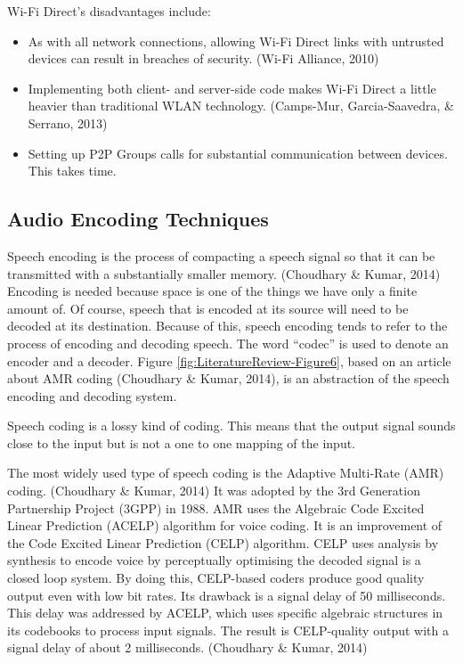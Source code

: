 \documentclass[12pt,svgnames,smaller]{article} %
\begin{document}
\begin{enumerate}
		Wi-Fi Direct’s disadvantages include:
		
		\begin{itemize}
			\item As with all network connections, allowing Wi-Fi Direct links with untrusted devices can result in breaches of security. (Wi-Fi Alliance, 2010)
			\item Implementing both client- and server-side code makes Wi-Fi Direct a little heavier than traditional WLAN technology. (Camps-Mur, Garcia-Saavedra, \& Serrano, 2013)
			\item Setting up P2P Groups calls for substantial communication between devices. This takes time. 
		\end{itemize}
		
		
	\end{enumerate} %
	
	
	\subsection{\textbf{Audio Encoding Techniques}}
	
	Speech encoding is the process of compacting a speech signal so that it can be transmitted with a substantially smaller memory. (Choudhary \& Kumar, 2014) Encoding is needed because space is one of the things we have only a finite amount of. Of course, speech that is encoded at its source will need to be decoded at its destination. Because of this, speech encoding tends to refer to the process of encoding and decoding speech. The word “codec” is used to denote an encoder and a decoder. Figure \ref{fig:LiteratureReview-Figure6}, based on an article about AMR coding (Choudhary \& Kumar, 2014), is an abstraction of the speech encoding and decoding system.
	
	Speech coding is a lossy kind of coding. This means that the output signal sounds close to the input but is not a one to one mapping of the input. 
	
	The most widely used type of speech coding is the Adaptive Multi-Rate (AMR) coding. (Choudhary \& Kumar, 2014) It was adopted by the 3rd Generation Partnership Project (3GPP) in 1988. AMR uses the Algebraic Code Excited Linear Prediction (ACELP) algorithm for voice coding. It is an improvement of the Code Excited Linear Prediction (CELP) algorithm. CELP uses analysis by synthesis to encode voice by perceptually optimising the decoded signal is a closed loop system. By doing this, CELP-based coders produce good quality output even with low bit rates. Its drawback is a signal delay of 50 milliseconds. This delay was addressed by ACELP, which uses specific algebraic structures in its codebooks to process input signals. The result is CELP-quality output with a signal delay of about 2 milliseconds. (Choudhary \& Kumar, 2014)
	
\end{document}
